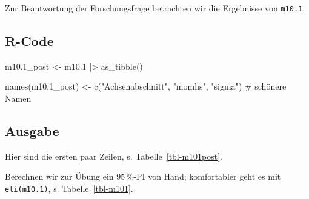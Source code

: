 \documentclass[
  ngerman,
  letterpaper,
  twoside,
  open=any]{scrbook}
\newenvironment{Shaded}{\begin{snugshade}}{\end{snugshade}}
\newcommand{\CommentTok}[1]{\textcolor[rgb]{0.37,0.37,0.37}{#1}}
\newcommand{\FloatTok}[1]{\textcolor[rgb]{0.68,0.00,0.00}{#1}}
\newcommand{\FunctionTok}[1]{\textcolor[rgb]{0.28,0.35,0.67}{#1}}
\newcommand{\NormalTok}[1]{\textcolor[rgb]{0.00,0.23,0.31}{#1}}
\newcommand{\OtherTok}[1]{\textcolor[rgb]{0.00,0.23,0.31}{#1}}
\newcommand{\SpecialCharTok}[1]{\textcolor[rgb]{0.37,0.37,0.37}{#1}}
\newcommand{\StringTok}[1]{\textcolor[rgb]{0.13,0.47,0.30}{#1}}
\theoremstyle{definition}
\theoremstyle{plain}
\theoremstyle{definition}
\theoremstyle{definition}
\theoremstyle{definition}
\theoremstyle{definition}
\theoremstyle{remark}
\begin{document}
Zur Beantwortung der Forschungsfrage betrachten wir die Ergebnisse von
\texttt{m10.1}.

\subsection{R-Code}

\begin{Shaded}
\begin{Highlighting}[]
\NormalTok{m10}\FloatTok{.1}\NormalTok{\_post }\OtherTok{\textless{}{-}}
\NormalTok{  m10}\FloatTok{.1} \SpecialCharTok{|\textgreater{}} 
  \FunctionTok{as\_tibble}\NormalTok{() }

\FunctionTok{names}\NormalTok{(m10}\FloatTok{.1}\NormalTok{\_post) }\OtherTok{\textless{}{-}} \FunctionTok{c}\NormalTok{(}\StringTok{"Achsenabschnitt"}\NormalTok{, }\StringTok{"momhs"}\NormalTok{, }\StringTok{"sigma"}\NormalTok{)  }\CommentTok{\# schönere Namen}
\end{Highlighting}
\end{Shaded}

\subsection{Ausgabe}

Hier sind die ersten paar Zeilen, s. Tabelle~\ref{tbl-m101post}.

\begin{table}

\caption{\label{tbl-m101post}m10.1, Stichprobe aus der Post-Verteilung,
ersten paar Zeilen}


\end{table}%

Berechnen wir zur Übung ein 95\,\%-PI von Hand; komfortabler geht es mit
\texttt{eti(m10.1)}, s. Tabelle~\ref{tbl-m101}.
\end{document}
